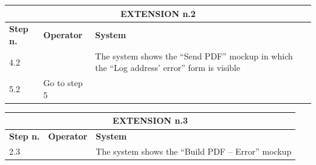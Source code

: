 {{{\begin{table}[h]
\begin{tabular}{|p{2cm}|p{6cm}|p{6cm}|}
				\multicolumn{3}{|c|}{EXTENSION n.2}\\
			\hline
				\centering \vspace{1mm} \bfseries{Step n.} \vspace{1mm} & \vspace{1mm} \bfseries{Operator} \vspace{1mm} & \vspace{1mm} \bfseries{System} \vspace{1mm}\\
			\hline
				\vspace{1mm} 4.2\vspace{1mm} &
				\vspace{1mm} \vspace{1mm} & 
				\vspace{1mm} The system shows the “Send PDF” mockup in which the “Log address’ error” form is visible \vspace{1mm} \\
			\hline
				\vspace{1mm} 5.2\vspace{1mm} &
				\vspace{1mm} Go to step 5\vspace{1mm} & 
				\vspace{1mm} \vspace{1mm} \\
			\hline
			\end{tabular}
			\end{table}
			\begin{table}[h]
			\begin{tabular}{|p{2cm}|p{6cm}|p{6cm}|}
			\hline
				\multicolumn{3}{|c|}{EXTENSION n.3}\\
			\hline
				\centering \vspace{1mm} \bfseries{Step n.} \vspace{1mm} & \vspace{1mm} \bfseries{Operator} \vspace{1mm} & \vspace{1mm} \bfseries{System} \vspace{1mm}\\
			\hline
				\vspace{1mm} 2.3\vspace{1mm} &
				\vspace{1mm} \vspace{1mm} & 
				\vspace{1mm} The system shows the “Build PDF – Error” mockup\vspace{1mm} \\

\end{tabular}
\end{table}}}}
